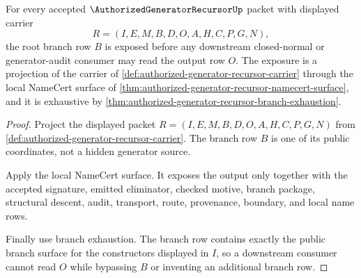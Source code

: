 \begin{theorem}
\label{thm:authorized-generator-recursor-root-branch-row-exposure}
For every accepted $\AuthorizedGeneratorRecursorUp$ packet with displayed carrier
$$
R=(I,E,M,B,D,O,A,H,C,P,G,N),
$$
the root branch row $B$ is exposed before any downstream closed-normal or generator-audit consumer may read the output row $O$. The exposure is a projection of the carrier of \autoref{def:authorized-generator-recursor-carrier} through the local NameCert surface of \autoref{thm:authorized-generator-recursor-namecert-surface}, and it is exhaustive by \autoref{thm:authorized-generator-recursor-branch-exhaustion}.
\end{theorem}
\begin{proof}
Project the displayed packet $R=(I,E,M,B,D,O,A,H,C,P,G,N)$ from \autoref{def:authorized-generator-recursor-carrier}. The branch row $B$ is one of its public coordinates, not a hidden generator source.

Apply the local NameCert surface. It exposes the output only together with the accepted signature, emitted eliminator, checked motive, branch package, structural descent, audit, transport, route, provenance, boundary, and local name rows.

Finally use branch exhaustion. The branch row contains exactly the public branch surface for the constructors displayed in $I$, so a downstream consumer cannot read $O$ while bypassing $B$ or inventing an additional branch row.
\end{proof}


